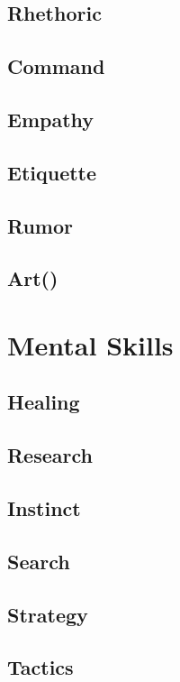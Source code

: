 \subsection{Rhethoric}\label{subsec:rhethoric}
\subsection{Command}\label{subsec:command}
\subsection{Empathy}\label{subsec:empathy}
\subsection{Etiquette}\label{subsec:etiquette}
\subsection{Rumor}\label{subsec:rumor}
\subsection{Art()}\label{subsec:art}

\section{Mental Skills}\label{sec:wisdom-skills}
\subsection{Healing}\label{subsec:healing}
\subsection{Research}\label{subsec:research}
\subsection{Instinct}\label{subsec:instinct}
\subsection{Search}\label{subsec:search}
\subsection{Strategy}\label{subsec:strategy}
\subsection{Tactics}\label{subsec:tactics}
